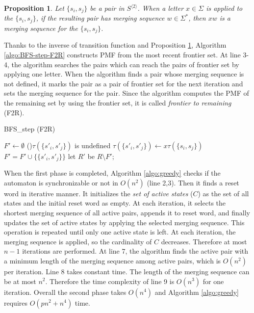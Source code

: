 \documentclass[12pt]{article}
\newtheorem{proposition}{Proposition}[section]
\begin{document}
\begin{proposition}
	\label{prop:merging}
	Let $\{ s_i,s_j \}$ be a pair in $S^{\langle 2 \rangle}$. When a letter $x \in \Sigma$ is applied to the $\{ s_i,s_j \}$, if the resulting pair has merging sequence $w \in \Sigma^*$, then $xw$ is a merging sequence for the $\{s_i,s_j \}$.
\end{proposition}

Thanks to the inverse of transition function and Proposition \ref{prop:merging}, Algorithm \ref{algo:BFS-step-F2R} constructs PMF from the most recent frontier set. At line 3-4, the algorithm searches the pairs which can reach the pairs of frontier set by applying one letter. When the algorithm finds a pair whose merging sequence is not defined, it marks the pair as a pair of frontier set for the next iteration and sets the merging sequence for the pair. Since the algorithm computes the PMF of the remaining set by using the frontier set, it is called \textit{frontier to remaining} (F2R). 

\begin{algorithm}[ht]
	\caption{{BFS\_step (F2R)}}
	\label{algo:BFS-step-F2R}
	
	
	$F' \longleftarrow \emptyset$\;
	{
		{
			{
				\If(){$\tau(\{ s'_i,s'_j\})$ is undefined}
				{
					$\tau(\{ s'_i,s'_j \}) \longleftarrow x \tau(\{ s_i,s_j \})$\;
					$F' = F' \cup \{ \{ s'_i,s'_j \}  \} $\;
				}
			}
		}
	}
	let $R'$ be $R \setminus F'$;
\end{algorithm}

When the first phase is completed, Algorithm \ref{algo:greedy} checks if the automaton is synchronizable or not in $O(n^2)$ (line 2,3). Then it finds a reset word in iterative manner. It initializes the \textit{set of active states} ($C$) as the set of all states and the initial reset word as empty. At each iteration, it selects the shortest merging sequence of all active pairs, appends it to reset word, and finally updates the set of active states by applying the selected merging sequence. This operation is repeated until only one active state is left. At each iteration, the merging sequence is applied, so the cardinality of $C$ decreases. Therefore at most $n-1$ iterations are performed. At line 7, the algorithm finds the active pair with a minimum length of the merging sequence among active pairs, which is $O(n^2)$ per iteration. Line 8 takes constant time. The length of the merging sequence can be at most $n^2$. Therefore the time complexity of line 9 is $O(n^3)$ for one iteration. Overall the second phase takes $O(n^4)$ and Algorithm \ref{algo:greedy} requires $O(pn^2 + n^4)$ time. 
\end{document}
